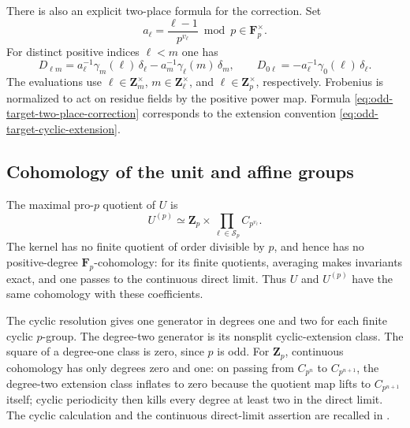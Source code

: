 There is also an explicit two-place formula for the
correction.  Set
\[
              a_\ell=\frac{\ell-1}{p^{v_\ell}}\bmod p
                                            \in\mathbf F_p^\times.
\]
For distinct positive indices \(\ell<m\) one has
\begin{equation}\label{eq:odd-target-two-place-correction}
 D_{\ell m}=
       a_\ell^{-1}\gamma_m(\ell)\,\delta_\ell
          -a_m^{-1}\gamma_\ell(m)\,\delta_m,
 \qquad
 D_{0\ell}=-a_\ell^{-1}\gamma_0(\ell)\,\delta_\ell.
\end{equation}
The evaluations use \(\ell\in\mathbf Z_m^\times\),
\(m\in\mathbf Z_\ell^\times\), and
\(\ell\in\mathbf Z_p^\times\), respectively.
Frobenius is normalized to act on residue fields by the
positive power map.  Formula
\eqref{eq:odd-target-two-place-correction} corresponds
to the extension convention
\eqref{eq:odd-target-cyclic-extension}.

\subsection{Cohomology of the unit and affine groups}

The maximal pro-\(p\) quotient of \(U\) is
\[
            U^{(p)}\simeq\mathbf Z_p
                    \times\prod_{\ell\in\mathcal S_p}
                                  C_{p^{v_\ell}}.
\]
The kernel has no finite quotient of order divisible by
\(p\), and hence has no positive-degree
\(\mathbf F_p\)-cohomology: for its finite quotients,
averaging makes invariants exact, and one passes to the
continuous direct limit.  Thus \(U\) and \(U^{(p)}\)
have the same cohomology with these coefficients.

The cyclic resolution gives one generator in degrees
one and two for each finite cyclic \(p\)-group.  The
degree-two generator is its nonsplit cyclic-extension
class.  The square of a degree-one class is zero, since
\(p\) is odd.  For \(\mathbf Z_p\), continuous
cohomology has only degrees zero and one: on passing
from \(C_{p^n}\) to \(C_{p^{n+1}}\), the degree-two
extension class inflates to zero because the quotient
map lifts to \(C_{p^{n+1}}\) itself; cyclic periodicity
then kills every degree at least two in the direct
limit.  The cyclic calculation and the continuous
direct-limit assertion are recalled in
\cite[II, Proposition~3.4, p.~81; Proposition~4.2,
pp.~87--88]{MilneCFT}.

